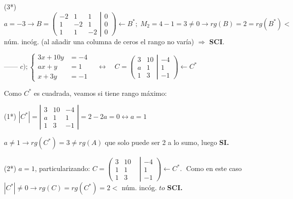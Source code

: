 \begin{proofw}
\noindent (3*) $a=-3 \to B=\left( \begin{matrix} \boxed{-2}&\boxed{1}&1\\\boxed{1}&\boxed{-2}&1\\1&1&-2 \end{matrix} \right| \left. \begin{matrix} 0\\0\\0 \end{matrix} \right) \leftarrow B^*  ;\; M_2=4-1=3\neq 0 \to rg(B)=2=rg(B^*)<$ núm. incóg. \textcolor{gris}{(al añadir una columna de ceros el rango no varía) } $\Rightarrow$ \textbf{ SCI}.

------ $c); \begin{cases}    3x+10y&=-4\\ax+y&=1\\x+3y&=-1      \end{cases}\quad \leftrightarrow \quad   C=\left( \begin{matrix} 3&10\\a&1\\1&3 \end{matrix} \right| \left. \begin{matrix} -4\\1\\-1 \end{matrix} \right) \leftarrow C^*$

\noindent Como $C^*$ es cuadrada, veamos si tiene rango máximo:

\noindent (1*) $ |C^*|=  \left| \begin{matrix} 3&10&-4\\a&1&1\\1&3&-1 \end{matrix} \right| = 2-2a=0 \leftrightarrow a=1 $

\noindent $a\neq 1 \to rg(C^*)=3 \neq rg(A)$ que solo puede ser 2 a lo sumo, luego \textbf{ SI.}

\noindent (2*) $a=1$, particularizando:  $C=\left( \begin{matrix} \boxed{3}&\boxed{10}&\\\boxed{1}&\boxed{1}\\1&3 \end{matrix} \right| \left. \begin{matrix} -4\\1\\-1 \end{matrix} \right) \leftarrow C^*.\;$ Como en este caso $|C^*|\neq 0 \to rg(C)=rg(C^*)=2<$ núm. incóg. $to$ \textbf{ SCI.}


\end{proofw}
